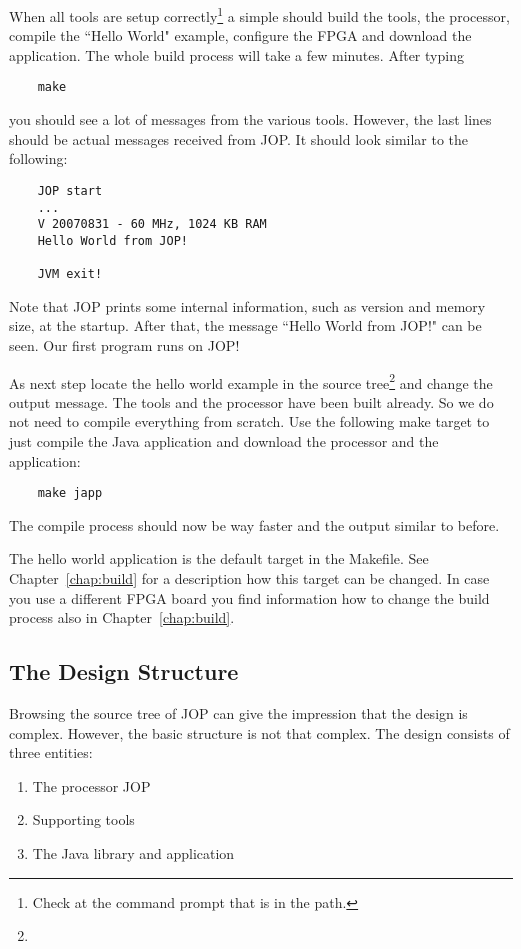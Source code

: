 When all tools are setup correctly\footnote{Check at the command
prompt that  is in the path.} a simple  should
build the tools, the processor, compile the ``Hello World" example,
configure the FPGA and download the application. The whole build
process will take a few minutes. After typing
\begin{verbatim}
    make
\end{verbatim}
you should see a lot of messages from the various tools. However,
the last lines should be actual messages received from JOP. It
should look similar to the following:
\begin{verbatim}
    JOP start
    ...
    V 20070831 - 60 MHz, 1024 KB RAM
    Hello World from JOP!

    JVM exit!
\end{verbatim}
Note that JOP prints some internal information, such as version and
memory size, at the startup. After that, the message ``Hello World
from JOP!" can be seen. Our first program runs on JOP!

As next step locate the hello world example in the source
tree\footnote{}
and change the output message. The tools and the processor have been
built already. So we do not need to compile everything from scratch.
Use the following make target to just compile the Java application
and download the processor and the application:
\begin{verbatim}
    make japp
\end{verbatim}
The compile process should now be way faster and the output similar
to before.

The hello world application is the default target in the Makefile.
See Chapter~\ref{chap:build} for a description how this target can
be changed. In case you use a different FPGA board you find
information how to change the build process also in
Chapter~\ref{chap:build}.

\subsection{The Design Structure}

Browsing the source tree of JOP can give the impression that the
design is complex. However, the basic structure is not that complex.
The design consists of three entities:
\begin{enumerate}
    \item The processor JOP
    \item Supporting tools
    \item The Java library and application
\end{enumerate}

